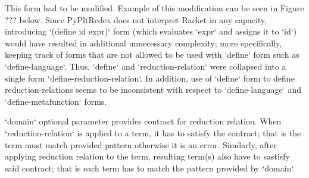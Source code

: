 This form had to be modified. Example of this modification can be seen in Figure ??? below. Since PyPltRedex does not interpret Racket in any capacity, introducing `(define id expr)` form (which evaluates `expr` and assigns it to `id`) would have resulted in additional unnecessary complexity; more specifically, keeping track of forms that are not allowed to be used with `define` form such as `define-language`. Thus, `define` and `reduction-relation` were collapsed into a single form `define-reduction-relation`. In addition, use of `define` form to define reduction-relations seems to be inconsistent with respect to `define-language` and `define-metafunction` forms.


`domain` optional parameter provides contract for reduction relation. When `reduction-relation` is applied to a term, it has to satisfy the contract; that is the term must match provided pattern otherwise it is an error. Similarly, after applying reduction relation to the term, resulting term(s) also have to sastisfy said contract; that is each term has to match the pattern provided by `domain`.
